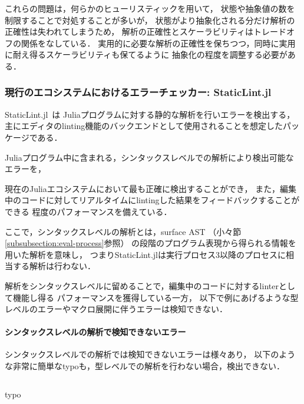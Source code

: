 これらの問題は，何らかのヒューリスティックを用いて，
状態や抽象値の数を制限することで対処することが多いが，
状態がより抽象化される分だけ解析の正確性は失われてしまうため，
解析の正確性とスケーラビリティはトレードオフの関係をなしている．
実用的に必要な解析の正確性を保ちつつ，同時に実用に耐え得るスケーラビリティも保てるように
抽象化の程度を調整する必要がある．

\subsubsection{現行のエコシステムにおけるエラーチェッカー: StaticLint.jl} \label{subsubsection:staticlint}

StaticLint.jl~\cite{staticlint}は
Juliaプログラムに対する静的な解析を行いエラーを検出する，
主にエディタのlinting機能のバックエンドとして使用されることを想定したパッケージである．

Juliaプログラム中に含まれる，シンタックスレベルでの解析により検出可能なエラーを，
\date{\today}現在のJuliaエコシステムにおいて最も正確に検出することができ，
また，編集中のコードに対してリアルタイムにlintingした結果をフィードバックすることができる
程度のパフォーマンスを備えている．

ここで，シンタックスレベルの解析とは，surface AST
（小々節\ref{subsubsection:eval-process}参照）
の段階のプログラム表現から得られる情報を用いた解析を意味し，
つまりStaticLint.jlは実行プロセス3以降のプロセスに相当する解析は行わない．

解析をシンタックスレベルに留めることで，編集中のコードに対するlinterとして機能し得る
パフォーマンスを獲得している一方，
以下で例にあげるような型レベルのエラーやマクロ展開に伴うエラーは検知できない．

\paragraph{シンタックスレベルの解析で検知できないエラー} \label{paragraph:syntax-analysis-limitation}

シンタックスレベルでの解析では検知できないエラーは様々あり，
以下のような非常に簡単なtypoも，型レベルでの解析を行わない場合，検出できない．

\begin{listing}[ht]
  \inputminted[frame=lines, linenos, firstnumber=1, firstline=23, lastline=33]{julia}{./src/typo.jl}
  \caption{typo}
  \label{lst:target3}
\end{listing}

